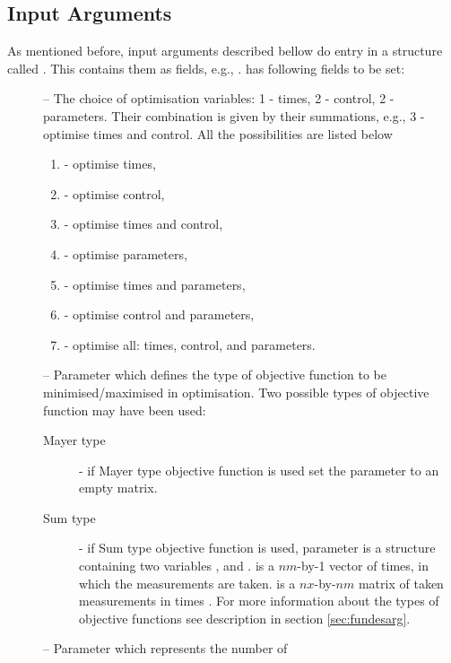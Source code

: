 \subsection{Input Arguments}
\label{sec:inarg}

As mentioned before, input arguments described bellow do entry
 in a structure called . This contains
them as fields, e.g., . 
has following fields to be set: 
\begin{description}
\item[] -- The choice of optimisation variables: 1 -
  times, 2 - control, 2 - parameters. Their combination is given by
  their summations, e.g., 3 - optimise times and control. All the
  possibilities are listed below
  \begin{enumerate}[1]
  \item - optimise times,
  \item - optimise control,
  \item - optimise times and control,
  \item - optimise parameters,
  \item - optimise times and parameters,
  \item - optimise control and parameters,
  \item - optimise all: times, control, and parameters.
  \end{enumerate}
\item[] -- Parameter which defines the type of
  objective function to be minimised/maximised in optimisation. Two
  possible types of objective function may have been used: 
  \begin{description}
  \item[Mayer type] - if Mayer type objective function is used set the
    parameter  to an empty matrix.
  \item[Sum type] - if Sum type objective function is used, parameter
     is a structure containing two variables
    , and .  is a $nm$-by-1 vector of
    times, in which the measurements are taken.  is a
    $nx$-by-$nm$ matrix of taken measurements in times
    . For more information about the types of objective
    functions see  description in section
    \ref{sec:fundesarg}. 
  \end{description}
\item[] -- Parameter which represents the number of

\end{description}
